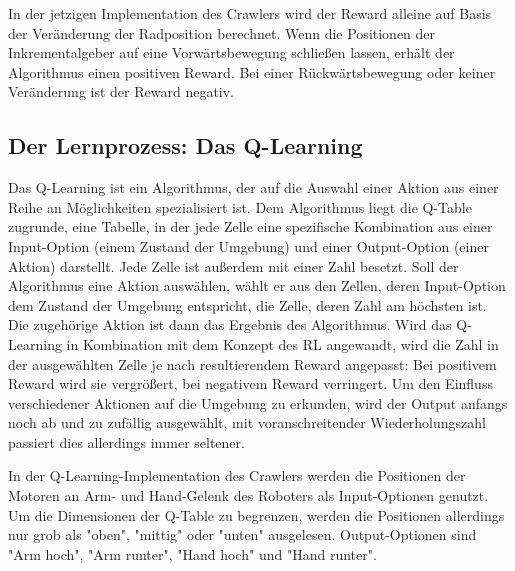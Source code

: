 In der jetzigen Implementation des Crawlers wird der Reward alleine auf Basis der Veränderung der Radposition berechnet. Wenn die Positionen der Inkrementalgeber auf eine Vorwärtsbewegung schließen lassen, erhält der Algorithmus einen positiven Reward. Bei einer Rückwärtsbewegung oder keiner Veränderung ist der Reward negativ.

\subsection{Der Lernprozess: Das Q-Learning}

Das Q-Learning ist ein Algorithmus, der auf die Auswahl einer Aktion aus einer Reihe an Möglichkeiten spezialisiert ist. Dem Algorithmus liegt die Q-Table zugrunde, eine Tabelle, in der jede Zelle eine spezifische Kombination aus einer Input-Option (einem Zustand der Umgebung) und einer Output-Option (einer Aktion) darstellt. Jede Zelle ist außerdem mit einer Zahl besetzt. Soll der Algorithmus eine Aktion auswählen, wählt er aus den Zellen, deren Input-Option dem Zustand der Umgebung entspricht, die Zelle, deren Zahl am höchsten ist. Die zugehörige Aktion ist dann das Ergebnis des Algorithmus. Wird das Q-Learning in Kombination mit dem Konzept des RL angewandt, wird die Zahl in der ausgewählten Zelle je nach resultierendem Reward angepasst: Bei positivem Reward wird sie vergrößert, bei negativem Reward verringert. Um den Einfluss verschiedener Aktionen auf die Umgebung zu erkunden, wird der Output anfangs noch ab und zu zufällig ausgewählt, mit voranschreitender Wiederholungszahl passiert dies allerdings immer seltener.

In der Q-Learning-Implementation des Crawlers werden die Positionen der Motoren an Arm- und Hand-Gelenk des Roboters als Input-Optionen genutzt. Um die Dimensionen der Q-Table zu begrenzen, werden die Positionen allerdings nur grob als "oben", "mittig" oder "unten" ausgelesen. Output-Optionen sind "Arm hoch", "Arm runter", "Hand hoch" und "Hand runter".


